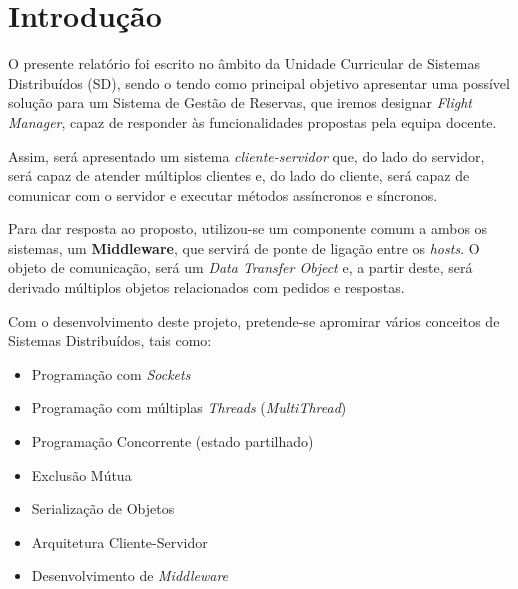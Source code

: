 \documentclass[a4paper,11pt]{article}
\begin{document}



\section{Introdução}

O presente relatório foi escrito no âmbito da Unidade Curricular de Sistemas Distribuídos (SD), sendo o
tendo como principal objetivo apresentar uma possível solução para um Sistema de Gestão de Reservas,
que iremos designar \textit{Flight Manager}, capaz de responder às funcionalidades propostas pela equipa docente.

Assim, será apresentado um sistema \textit{cliente-servidor} que, do lado do servidor,
será capaz de atender múltiplos clientes e, do lado do cliente, será capaz de comunicar com o servidor
e executar métodos assíncronos e síncronos.

Para dar resposta ao proposto, utilizou-se um componente comum a ambos os sistemas, um \textbf{Middleware},
que servirá de ponte de ligação entre os \textit{hosts}.
O objeto de comunicação, será um \textit{Data Transfer Object} e, a partir deste, será derivado
múltiplos objetos relacionados com pedidos e respostas.

Com o desenvolvimento deste projeto, pretende-se apromirar vários conceitos de Sistemas Distribuídos,
tais como:
\begin{itemize}
    \item Programação com \textit{Sockets}
    \item Programação com múltiplas \textit{Threads} (\textit{MultiThread})
    \item Programação Concorrente (estado partilhado)
    \item Exclusão Mútua
    \item Serialização de Objetos
    \item Arquitetura Cliente-Servidor
    \item Desenvolvimento de \textit{Middleware}
\end{itemize}
\end{document}
